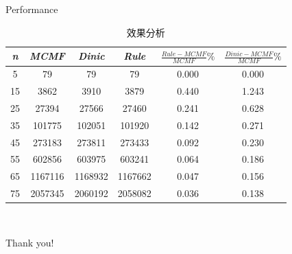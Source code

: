 \documentclass{beamer}
\begin{document}
\begin{frame}{Performance}
\begin{table}[H]
\label{tab:2}
\centering
\begin{tabular}{|c|c|c|c|c|c|}
\hline
\emph{n} & \emph{MCMF} & \emph{Dinic} & \emph{Rule} & $\frac{Rule-MCMF}{MCMF}\%$&$\frac{Dinic-MCMF}{MCMF}\%$\\
\hline
5 & 79 & 79 & 79 & 0.000&0.000 \\
\hline
15 & 3862&3910&3879&0.440&1.243 \\
\hline
25 & 27394	&   27566	 &  27460	&0.241& 0.628\\
\hline
35 &101775	&  102051	&  101920	&	0.142&0.271\\
\hline
45 & 273183	 & 273811	&  273433	&	0.092 &0.230\\
\hline
55 & 602856	 & 603975	&  603241	&0.064 &0.186\\
\hline
65 & 1167116	& 1168932	& 1167662	&	0.047&0.156\\
\hline
75 & 2057345	& 2060192	& 2058082	&	0.036&0.138\\
\hline
\end{tabular}
\caption{效果分析}
\end{table}
\end{frame}
\begin{frame}{~}
	\begin{center}
		{\Huge\calligra Thank you!}
	\end{center}
\end{frame}
\end{document}
